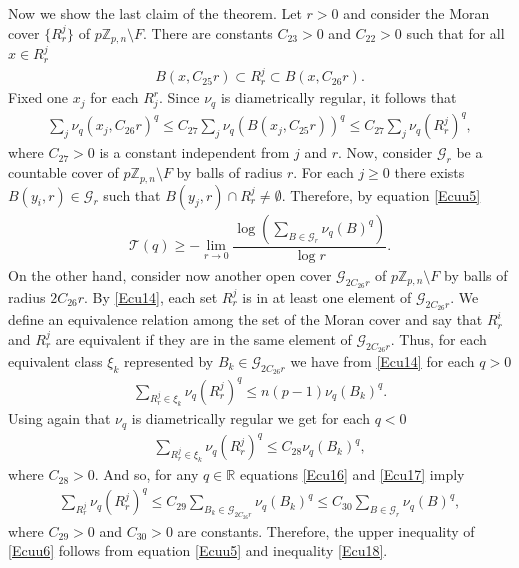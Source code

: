 \documentclass[11pt]{amsart}
\theoremstyle{remark}
\numberwithin{equation}{section}
\newcommand{\Z}{\mathbb{Z}}
\begin{document}
Now we show the last claim of the theorem. Let $r>0$ and consider the Moran cover $\{R_{r}^{j}\}$ of $p\Z_{p,n}\setminus F$. There are constants $C_{23}>0$ and $C_{22}>0$ such that  for all $x\in R_{r}^{j}$ 
\begin{align}\label{Ecu14}
    B(x,C_{25}r)\subset R_{r}^{j}\subset B(x,C_{26}r).
\end{align}Fixed one $x_{j}$ for each $R_{j}^{r}$. Since $\nu_{q}$ is diametrically regular, it follows that 
\begin{align}\label{Ecu15}
    \sum_{j}\nu_{q}(x_{j},C_{26}r)^{q}\leq C_{27}\sum_{j}\nu_{q}(B(x_{j},C_{25}r))^{q}\leq C_{27}\sum_{j}\nu_{q}(R^{j}_{r})^{q},
\end{align}where $C_{27}>0$ is a constant independent from $j$ and $r$. Now, consider $\mathcal{G}_{r}$ be a countable cover of $p\Z_{p,n}\setminus F$ by balls of radius $r$. For each $j\geq 0$ there exists $B(y_{i},r)\in \mathcal{G}_{r}$ such that $B(y_{j},r)\cap R^{j}_{r}\neq \emptyset$. Therefore, by equation \eqref{Ecuu5}
\begin{align}\label{Ecuu6}
    \mathcal{T}(q)\geq  -\lim_{r\to 0}\dfrac{\log(\sum_{B\in \mathcal{G}_{r}}\nu_{q}(B)^{q})}{\log r}.
\end{align} On the other hand, consider now another open cover $\mathcal{G}_{2C_{26}r}$ of $p\Z_{p,n}\setminus F$ by balls of radius $2C_{26}r$. By \eqref{Ecu14}, each set $R_{r}^{j}$ is in at least one element of $\mathcal{G}_{2C_{26}r}$.  We define an equivalence relation among the set of the Moran cover and say that $R_{r}^{i}$ and $R_{r}^{j}$ are equivalent if they are in the same element of $\mathcal{G}_{2C_{26}r}$. Thus, for each equivalent class $\xi_{k}$ represented by $B_{k}\in \mathcal{G}_{2C_{26}r}$ we have from \eqref{Ecu14} for each $q>0$
\begin{align}\label{Ecu16}
  \sum_{R_{r}^{j}\in \xi_{k}}\nu_{q}(R_{r}^{j})^{q}\leq n(p-1)\nu_{q}(B_{k})^{q}.  
\end{align}Using again that $\nu_{q}$ is diametrically regular we get for each $q<0$
\begin{align}\label{Ecu17}
    \sum_{R_{r}^{j}\in \xi_{k}}\nu_{q}(R_{r}^{j})^{q}\leq C_{28}\nu_{q}(B_{k})^{q},
\end{align}where $C_{28}>0$. And so, for any $q\in \mathbb{R}$ equations \eqref{Ecu16}
 and \eqref{Ecu17} imply
 \begin{align}\label{Ecu18}
     \sum_{R_{r}^{j}}\nu_{q}(R_{r}^{j})^{q}\leq C_{29}\sum_{B_{k}\in \mathcal{G}_{2C_{26}r}}\nu_{q}(B_{k})^{q} \leq C_{30}\sum_{B\in \mathcal{G}_{r}}\nu_{q}(B)^{q},
 \end{align} where $C_{29}>0$ and $C_{30}>0$ are constants. Therefore, the upper inequality of \eqref{Ecuu6} follows from equation \eqref{Ecuu5} and inequality \eqref{Ecu18}.
\end{document}
